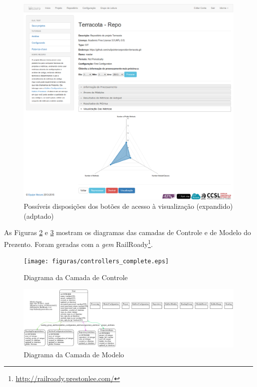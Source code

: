 \begin{figure}[!htb]
	\centering
    \includegraphics[keepaspectratio=true,scale=0.33]
    {figuras/exmplo_disposicao_botao_visualizacao_2.eps}
  \caption{Possíveis disposições dos botões de acesso à visualização
  (expandido) (adptado) \cite{filgueiras2014mezuro}}
  \label{fig:exmplo_disposicao_botao_visualizacao_2}
\end{figure}

\newpage

As Figuras \ref{fig:controllers_complete} e \ref{fig:models_complete} mostram os
diagramas das camadas de Controle e de Modelo do Prezento. Foram geradas com a
\textit{gem} RailRoady\footnote{\url{http://railroady.prestonlee.com/}}.


\begin{figure}[!htb]
	\centering
    \texttt{[image: figuras/controllers\_complete.eps]}
  \caption{Diagrama da Camada de Controle}
  \label{fig:controllers_complete}
\end{figure}


\begin{figure}[!htb]
	\centering
    \includegraphics[keepaspectratio=true,scale=0.25]
    {figuras/models_complete.eps}
  \caption{Diagrama da Camada de Modelo}
  \label{fig:models_complete}
\end{figure}

